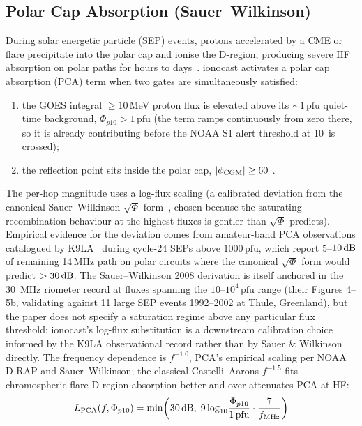 \documentclass[11pt,a4paper]{article}
\newcommand{\SI}[2]{#1\,\text{#2}}
\newcommand{\si}[1]{\text{#1}}
\newcommand{\dB}{\text{dB}}
\begin{document}
\subsection{Polar Cap Absorption (Sauer--Wilkinson)}\label{sec:lpca}

During solar energetic particle (SEP) events, protons accelerated by a
CME or flare precipitate into the polar cap and ionise the D-region,
producing severe HF absorption on polar paths for hours to
days~\cite{sauer2008}.  ionocast activates a polar cap absorption
(PCA) term when two gates are simultaneously satisfied:
\begin{enumerate}[nosep]
  \item the GOES integral $\geq 10$\,MeV proton flux is elevated
        above its ${\sim}\SI{1}{pfu}$ quiet-time background,
        $\Phi_{p10} > \SI{1}{pfu}$ (the term ramps continuously from
        zero there, so it is already contributing before the NOAA S1
        alert threshold at \SI{10}{pfu} is crossed);
  \item the reflection point sits inside the polar cap,
        $|\phi_{\text{CGM}}| \geq 60\text{\textdegree}$.
\end{enumerate}
The per-hop magnitude uses a log-flux scaling (a calibrated
deviation from the canonical Sauer--Wilkinson $\sqrt{\Phi}$
form~\cite{sauer2008}, chosen because the saturating-recombination
behaviour at the highest fluxes is gentler than $\sqrt{\Phi}$
predicts).  Empirical evidence for the deviation comes from
amateur-band PCA observations catalogued by K9LA~\cite{k9la} during
cycle-24 SEPs above $1000\,\text{pfu}$, which report
$5$--$10\,\si{\dB}$ of remaining 14\,MHz path on polar circuits
where the canonical $\sqrt{\Phi}$ form would predict $>30\,\si{\dB}$.
The Sauer--Wilkinson 2008 derivation is itself anchored in the
30~MHz riometer record at fluxes spanning the $10$--$10^{4}\,\text{pfu}$
range (their Figures 4--5b, validating against 11 large
SEP events 1992--2002 at Thule, Greenland), but the paper does not
specify a saturation regime above any particular flux threshold;
ionocast's log-flux substitution is a downstream calibration choice
informed by the K9LA observational record rather than by Sauer \&
Wilkinson directly.  The frequency dependence is $f^{-1.0}$,
PCA's empirical scaling per NOAA D-RAP and Sauer--Wilkinson; the
classical Castelli--Aarons $f^{-1.5}$ fits chromospheric-flare
D-region absorption better and over-attenuates PCA at HF:
\begin{equation}\label{eq:lpca}
  L_{\text{PCA}}(f, \Phi_{p10}) = \min\!\left(
    \SI{30}{\dB},\;
    9\log_{10}\!\frac{\Phi_{p10}}{\SI{1}{pfu}}
    \cdot \frac{7}{f_{\text{MHz}}}
  \right)
\end{equation}
\end{document}
